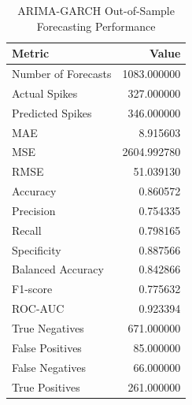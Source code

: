 \begin{table}
\caption{ARIMA-GARCH Out-of-Sample Forecasting Performance}
\label{tab:4.6}
\begin{tabular}{lr}
\toprule
Metric & Value \\
\midrule
Number of Forecasts & 1083.000000 \\
Actual Spikes & 327.000000 \\
Predicted Spikes & 346.000000 \\
MAE & 8.915603 \\
MSE & 2604.992780 \\
RMSE & 51.039130 \\
Accuracy & 0.860572 \\
Precision & 0.754335 \\
Recall & 0.798165 \\
Specificity & 0.887566 \\
Balanced Accuracy & 0.842866 \\
F1-score & 0.775632 \\
ROC-AUC & 0.923394 \\
True Negatives & 671.000000 \\
False Positives & 85.000000 \\
False Negatives & 66.000000 \\
True Positives & 261.000000 \\
\bottomrule
\end{tabular}
\end{table}
